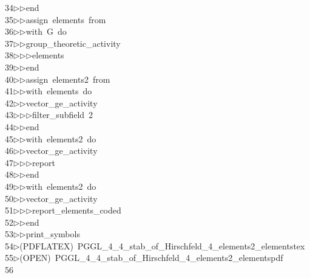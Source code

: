 \begin{tabbing}
34\>$\triangleright$\>$\triangleright$\>end\ \\[0pt]
35\>$\triangleright$\>$\triangleright$\>assign\ elements\ from\ \\[0pt]
36\>$\triangleright$\>$\triangleright$\>with\ G\ do\ \\[0pt]
37\>$\triangleright$\>$\triangleright$\>group\_theoretic\_activity\ \\[0pt]
38\>$\triangleright$\>$\triangleright$\>$\triangleright$\>elements\ \\[0pt]
39\>$\triangleright$\>$\triangleright$\>end\ \\[0pt]
40\>$\triangleright$\>$\triangleright$\>assign\ elements2\ from\ \\[0pt]
41\>$\triangleright$\>$\triangleright$\>with\ elements\ do\ \\[0pt]
42\>$\triangleright$\>$\triangleright$\>vector\_ge\_activity\ \\[0pt]
43\>$\triangleright$\>$\triangleright$\>$\triangleright$\>filter\_subfield\ 2\ \\[0pt]
44\>$\triangleright$\>$\triangleright$\>end\ \\[0pt]
45\>$\triangleright$\>$\triangleright$\>with\ elements2\ do\ \\[0pt]
46\>$\triangleright$\>$\triangleright$\>vector\_ge\_activity\ \\[0pt]
47\>$\triangleright$\>$\triangleright$\>$\triangleright$\>report\ \\[0pt]
48\>$\triangleright$\>$\triangleright$\>end\ \\[0pt]
49\>$\triangleright$\>$\triangleright$\>with\ elements2\ do\ \\[0pt]
50\>$\triangleright$\>$\triangleright$\>vector\_ge\_activity\ \\[0pt]
51\>$\triangleright$\>$\triangleright$\>$\triangleright$\>report\_elements\_coded\ \\[0pt]
52\>$\triangleright$\>$\triangleright$\>end\ \\[0pt]
53\>$\triangleright$\>$\triangleright$\>print\_symbols\\[0pt]
54\>$\triangleright$\>(PDFLATEX)\ PGGL\_4\_4\_stab\_of\_Hirschfeld\_4\_elements2\_elementstex\\[0pt]
55\>$\triangleright$\>(OPEN)\ PGGL\_4\_4\_stab\_of\_Hirschfeld\_4\_elements2\_elementspdf\\[0pt]
56\>\end{tabbing}
